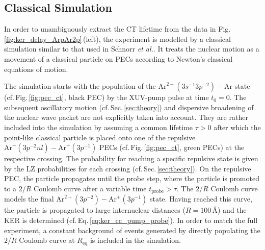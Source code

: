 \documentclass[%
 aip,
rsi,%
 amsmath,amssymb,
preprint,%
]{revtex4-1}
\begin{document}
 \subsection{Classical Simulation}
  \label{sec:simulation}

In order to unambiguously extract the CT lifetime from the data in Fig.\,\ref{fig:ker_delay_ArpAr2p}\,(left), the experiment is modelled by a classical simulation similar to that used in Schnorr \textit{et al.}\cite{schnorr2013,schnorr2015}. It treats the nuclear motion as a movement of a classical particle on PECs according to Newton's classical equations of motion. 

The simulation starts with the population of the $\mathrm{Ar}^{2+}(3s^{-1}3p^{-2}) - \mathrm{Ar}$ state (cf.\,Fig.\,\ref{fig:pec_ct}, black PEC) by the XUV-pump pulse at time $t_0=0$. The subsequent oscillatory motion (cf.\,Sec.\,\ref{sec:theory}) and dispersive broadening of the nuclear wave packet are not explicitly taken into account. They are rather included into the simulation by assuming a common lifetime $\tau > 0$ after which the point-like classical particle is placed onto one of the repulsive $\mathrm{Ar}^{+}(3p^{-2}nl) - \mathrm{Ar}^+(3p^{-1})$ PECs (cf.\,Fig.\,\ref{fig:pec_ct}, green PECs) at the respective crossing.
The probability for reaching a specific repulsive state is given by the LZ probabilities for each crossing (cf.\,Sec.\,\ref{sec:theory}). 
On the repulsive PEC, the particle propagates until the probe step, where the particle is promoted to a $2/R$ Coulomb curve after a variable time $t_{\mathrm{probe}} > \tau$. The $2/R$ Coulomb curve models the final $\mathrm{Ar}^{2+}(3p^{-2}) - \mathrm{Ar}^+(3p^{-1})$ state. Having reached this curve, the particle is propagated to large internuclear distances ($R = 100$\,\AA) and the KER is determined (cf.\,Eq.\,\ref{eq:ker_cc_pump_probe}). In order to match the full experiment, a constant background of events generated by directly populating the $2/R$ Coulomb curve at $R_{\mathrm{eq}}$ is included in the simulation. 
\end{document}
